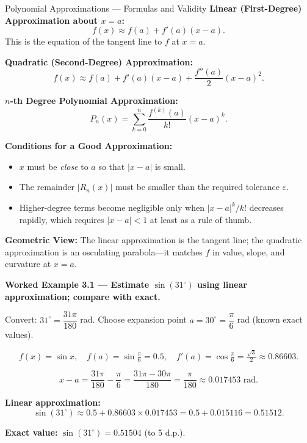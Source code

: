 \documentclass[12pt,a4paper]{article}
\begin{document}
\begin{infobox}{Polynomial Approximations --- Formulas and Validity}
\textbf{Linear (First-Degree) Approximation about \(x = a\):}
\[
  f(x) \approx f(a) + f'(a)(x - a).
\]
This is the equation of the tangent line to \(f\) at \(x = a\).

\medskip
\textbf{Quadratic (Second-Degree) Approximation:}
\[
  f(x) \approx f(a) + f'(a)(x-a) + \frac{f''(a)}{2}(x-a)^2.
\]

\medskip
\textbf{\(n\)-th Degree Polynomial Approximation:}
\[
  P_n(x) = \sum_{k=0}^{n} \frac{f^{(k)}(a)}{k!}(x-a)^k.
\]

\textbf{Conditions for a Good Approximation:}
\begin{itemize}[leftmargin=1.5em]
  \item \(x\) must be \emph{close} to \(a\) so that \(|x - a|\) is small.
  \item The remainder \(|R_n(x)|\) must be smaller than the required tolerance \(\varepsilon\).
  \item Higher-degree terms become negligible only when \(|x-a|^k / k!\) decreases rapidly,
        which requires \(|x - a| < 1\) at least as a rule of thumb.
\end{itemize}

\textbf{Geometric View:} The linear approximation is the tangent line; the quadratic approximation
is an osculating parabola---it matches \(f\) in value, slope, and curvature at \(x = a\).
\end{infobox}

\textbf{Worked Example 3.1 --- Estimate \(\sin(31^{\circ})\) using linear approximation; compare
with exact.}

Convert: \(31^{\circ} = \dfrac{31\pi}{180}\) rad.
Choose expansion point \(a = 30^{\circ} = \dfrac{\pi}{6}\) rad (known exact values).

\[
  f(x) = \sin x, \quad f(a) = \sin\!\tfrac{\pi}{6} = 0.5, \quad
  f'(a) = \cos\!\tfrac{\pi}{6} = \tfrac{\sqrt{3}}{2} \approx 0.86603.
\]

\[
  x - a = \frac{31\pi}{180} - \frac{\pi}{6}
        = \frac{31\pi - 30\pi}{180}
        = \frac{\pi}{180} \approx 0.017453 \text{ rad}.
\]

\textbf{Linear approximation:}
\[
  \sin(31^{\circ}) \approx 0.5 + 0.86603 \times 0.017453
                         = 0.5 + 0.015116
                         = 0.51512.
\]

\textbf{Exact value:} \(\sin(31^{\circ}) = 0.51504\) (to 5 d.p.).
\end{document}
